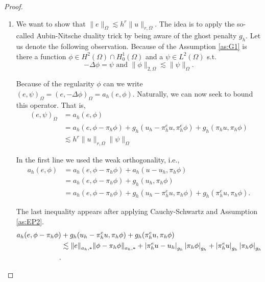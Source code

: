 \begin{proof}
\begin{enumerate}[label=\arabic*)]
\item We want to show that $ \| e \|_{ \Omega  }^{  } \lesssim   h^{r} \| u \|_{ r,\Omega  }^{  }$. The idea is to apply the so-called Aubin-Nitsche duality trick by being aware of the ghost penalty $g_{h}$. Let us denote the following observation.
    Because of the Assumption \ref{as:G1} is there a function $\phi \in H^2( \Omega ) \cap H^{1}_{0}( \Omega ) $ and a $\psi \in L^2( \Omega )  $ s.t.
    $$-\Delta \phi = \psi  \text{ and }  \| \phi  \|_{ 2, \Omega  }^{  } \lesssim \| \psi  \|_{ \Omega  }^{  }.$$

    Because of the regularity $\phi $ can we write $ (e, \psi  )_{\Omega } = (e, -\Delta \phi )_{\Omega } = a_{h}(e, \phi )  $. Naturally, we can now seek to bound this operator. That is,
    \[
    \begin{split}
        (e, \psi  )_{\Omega } &= a_{h}( e, \phi ) \\
        &= a_{h}(e, \phi -  \pi_{h} \phi   ) + g_{h}(u_{h} - \pi^{e} _{h} u,   \pi^{e}_{h} \phi   )  +g_{h}(\pi _{h} u, \pi_{h} \phi   ) \\
        & \lesssim h^{r} \| u \|_{ r, \Omega  }^{  } \| \psi  \|_{ \Omega  }^{  }
    \end{split}
    \]

    In the first line we used the weak orthogonality, i.e.,
    \[
        \begin{split}
    a_{h}( e, \phi ) & = a_{h}( e, \phi  - \pi _{h} \phi ) + a_{h}( u - u_{h}, \pi _{h} \phi ) \\
     & = a_{h}( e, \phi  - \pi _{h} \phi ) + g_{h}(  u_{h}, \pi _{h} \phi ) \\
     & = a_{h}( e, \phi  - \pi _{h} \phi ) + g_{h}(  u_{h} - \pi ^{e}_{h}u, \pi _{h} \phi )+ g_{h}( \pi ^{e}_{h}u, \pi _{h} \phi ).
        \end{split}
    \]

    The last inequality appears after applying Cauchy-Schwartz and Assumption \ref{as:EP2}.
\[
    \begin{split}
        a_{h}( e, \phi  - \pi _{h} \phi ) &+ g_{h}(  u_{h} - \pi ^{e}_{h}u, \pi _{h} \phi )+ g_{h}( \pi ^{e}_{h}u, \pi _{h} \phi ) \\
                                          &\lesssim \| e \|_{ a_{h},*  }^{  } \| \phi - \pi _{h} \phi   \|_{a_{h},*  }^{  }   +
     \left\lvert \pi _{h}^{e} u - u_{h}  \right\rvert_{ g_{h}}^{  } \left\lvert  \pi _{h} \phi   \right\rvert_{g_{h}}+ \left\lvert  \pi^{e} _{h} u  \right\rvert _{g_{h}} \left\lvert  \pi _{h} \phi   \right\rvert_{g_{h}} \\
.
    \end{split}
\]


\end{enumerate}
\end{proof}
